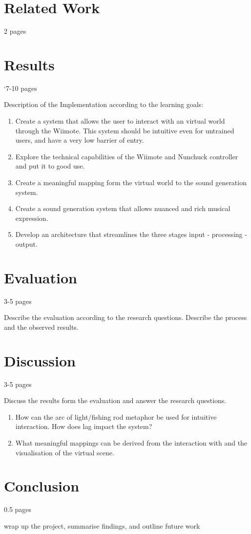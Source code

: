 \documentclass[10pt,a4paper]{scrartcl}
\begin{document}
\section{Related Work}
2 pages

\section{Results}
`7-10 pages

Description of the Implementation according to the learning goals:

\begin{enumerate}
\item Create a system that allows the user to interact with an virtual world through the Wiimote. This system should be intuitive even for untrained users, and have a very low barrier of entry.

\item Explore the technical capabilities of the Wiimote and Nunchuck controller and put it to good use.

\item Create a meaningful mapping form the virtual world to the sound generation system.

\item Create a sound generation system that allows nuanced and rich musical expression.
\item  Develop an architecture that streamlines the three stages input - processing - output.
\end{enumerate}

\section{Evaluation}
3-5 pages

Describe the evaluation according to the research questions. Describe the process and the observed results.


\section{Discussion}
3-5 pages

Discuss the results form the evaluation and answer the research questions. 

\begin{enumerate}
\item How can the arc of light/fishing rod metaphor be used for intuitive interaction. How does lag impact the system?
\item What meaningful mappings can be derived from the interaction with and the visualisation of the virtual scene.
\end{enumerate}

\section{Conclusion}
0.5 pages

wrap up the project, summarise findings, and outline future work






\end{document}
